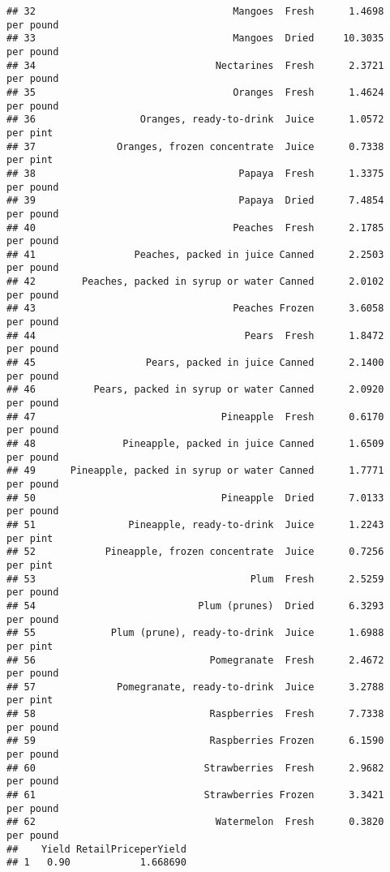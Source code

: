 \documentclass[
]{article}
\begin{document}
\begin{verbatim}
## 32                                  Mangoes  Fresh      1.4698       per pound
## 33                                  Mangoes  Dried     10.3035       per pound
## 34                               Nectarines  Fresh      2.3721       per pound
## 35                                  Oranges  Fresh      1.4624       per pound
## 36                  Oranges, ready-to-drink  Juice      1.0572        per pint
## 37              Oranges, frozen concentrate  Juice      0.7338        per pint
## 38                                   Papaya  Fresh      1.3375       per pound
## 39                                   Papaya  Dried      7.4854       per pound
## 40                                  Peaches  Fresh      2.1785       per pound
## 41                 Peaches, packed in juice Canned      2.2503       per pound
## 42        Peaches, packed in syrup or water Canned      2.0102       per pound
## 43                                  Peaches Frozen      3.6058       per pound
## 44                                    Pears  Fresh      1.8472       per pound
## 45                   Pears, packed in juice Canned      2.1400       per pound
## 46          Pears, packed in syrup or water Canned      2.0920       per pound
## 47                                Pineapple  Fresh      0.6170       per pound
## 48               Pineapple, packed in juice Canned      1.6509       per pound
## 49      Pineapple, packed in syrup or water Canned      1.7771       per pound
## 50                                Pineapple  Dried      7.0133       per pound
## 51                Pineapple, ready-to-drink  Juice      1.2243        per pint
## 52            Pineapple, frozen concentrate  Juice      0.7256        per pint
## 53                                     Plum  Fresh      2.5259       per pound
## 54                            Plum (prunes)  Dried      6.3293       per pound
## 55             Plum (prune), ready-to-drink  Juice      1.6988        per pint
## 56                              Pomegranate  Fresh      2.4672       per pound
## 57              Pomegranate, ready-to-drink  Juice      3.2788        per pint
## 58                              Raspberries  Fresh      7.7338       per pound
## 59                              Raspberries Frozen      6.1590       per pound
## 60                             Strawberries  Fresh      2.9682       per pound
## 61                             Strawberries Frozen      3.3421       per pound
## 62                               Watermelon  Fresh      0.3820       per pound
##    Yield RetailPriceperYield
## 1   0.90            1.668690

\end{verbatim}
\end{document}
